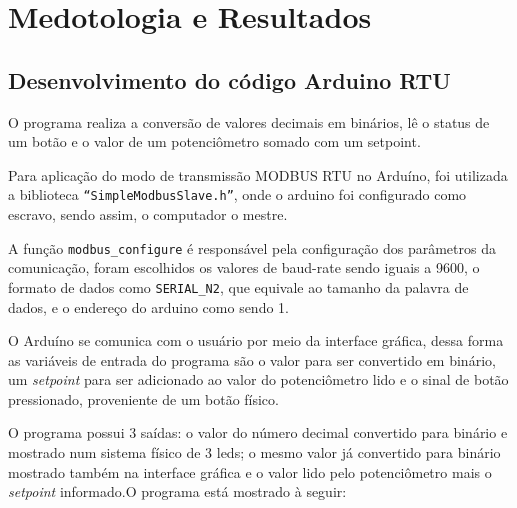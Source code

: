 \chapter{Medotologia e Resultados}\label{cap:CnptDsng}
\section{Desenvolvimento do código Arduino RTU}
O programa realiza a conversão de valores decimais em binários, lê o status de um botão e o valor de um potenciômetro somado com um setpoint. 

Para aplicação do modo de transmissão MODBUS RTU no Arduíno, foi utilizada a biblioteca \verb|“SimpleModbusSlave.h”|, onde o arduino foi configurado como escravo, sendo assim, o computador o mestre.

A função \verb|modbus_configure| é responsável pela configuração dos parâmetros da comunicação, foram escolhidos os valores de baud-rate sendo iguais a 9600, o formato de dados como \verb|SERIAL_N2|, que equivale ao tamanho da palavra de dados, e o endereço do arduino como sendo 1.

O Arduíno se comunica com o usuário por meio da interface gráfica, dessa forma as variáveis de entrada do programa são o valor para ser convertido em binário, um \textit{setpoint} para ser adicionado ao valor do potenciômetro lido e o sinal de botão pressionado, proveniente de um botão físico. 

O programa possui 3 saídas: o valor do número decimal convertido para binário e mostrado num sistema físico de 3 leds; o mesmo valor já convertido para binário mostrado também na interface gráfica e o valor lido pelo potenciômetro mais o \textit{setpoint} informado.O programa está mostrado à seguir:


